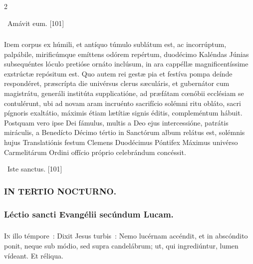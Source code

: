\documentclass[9pt,twoside]{extarticle}
\begin{document}
\begin{multicols}{2}
{{\begin{tightlist}{}
\item {}~Amávit eum. [101]
\end{tightlist}

\subsubsection*{\center {}}
\lettrine{I}dem corpus ex húmili, et antíquo túmulo sublátum est, ac incorrúptum, palpábile, mirificúmque emíttens odórem repértum, duodécimo Kaléndas Júnias subsequéntes lóculo pretióse ornáto inclúsum, in ara cappéllæ magnificentíssime exstrúctæ repósitum est. Quo autem rei gestæ pia et festíva pompa deínde respondéret, præscrípta die univérsus clerus sæculáris, et gubernátor cum magistrátu, generáli institúta supplicatióne, ad præfátam cœnóbii ecclésiam se contulérunt, ubi ad novam aram incruénto sacrifício solémni ritu obláto, sacri pígnoris exaltátio, máximis étiam lætítiæ signis éditis, compleméntum hábuit. Postquam vero ipse Dei fámulus, multis a Deo ejus intercessióne, patrátis miráculis, a Benedícto Décimo tértio in Sanctórum album relátus est, solémnis hujus Translatiónis festum Clemens Duodécimus Póntifex Máximus univérso Carmelitárum Ordini offício próprio celebrándum concéssit.

\begin{tightlist}{}
\item {}~Iste sanctus. [101]
\end{tightlist}

\subsubsection*{\center \textsc{IN TERTIO NOCTURNO.}}
\subsubsection*{\center Léctio sancti Evangélii secúndum Lucam.}
\subsubsection*{\center {}}
\lettrine{I}n illo témpore~: Dixit Jesus turbis~: Nemo lucérnam accéndit, et in abscóndito ponit, neque sub módio, sed supra candelábrum; ut, qui ingrediúntur, lumen vídeant. Et réliqua.

}}
\end{multicols}
\end{document}
